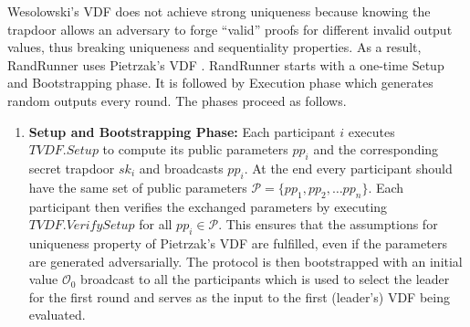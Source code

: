 \documentclass[letterpaper,twocolumn,10pt]{article}
\theoremstyle{definition}
\theoremstyle{remark}
\begin{document}
Wesolowski’s VDF \cite{wesolowski2019efficient} does not achieve strong uniqueness because knowing the trapdoor allows an adversary to forge ``valid'' proofs for different invalid output values, thus breaking uniqueness and sequentiality properties. As a result, RandRunner uses Pietrzak's VDF \cite{pietrzak2018simple}. RandRunner starts with a one-time Setup and Bootstrapping phase. It is followed by Execution phase which generates random outputs every round. The phases proceed as follows.
\begin{enumerate}
\item \textbf{Setup and Bootstrapping Phase:} Each participant $i$ executes $TVDF.Setup$ to compute its public parameters $pp_i$ and the corresponding secret trapdoor $sk_i$ and broadcasts $pp_i$. At the end every participant should have the same set of public parameters $\mathcal{P} = \{ pp_1, pp_2, \ldots pp_n \}$.  Each participant then verifies the exchanged parameters by executing $TVDF.VerifySetup$ for all $pp_i \in \mathcal{P}$. This ensures that the assumptions for uniqueness property of Pietrzak’s VDF \cite{pietrzak2018simple} are fulfilled, even if the parameters are generated adversarially. The protocol is then bootstrapped with an initial value $\mathcal{O}_0$ broadcast to all the participants which is used to select the leader for the first round and serves as the input to the first (leader’s) VDF being evaluated.


\end{enumerate}
\end{document}
